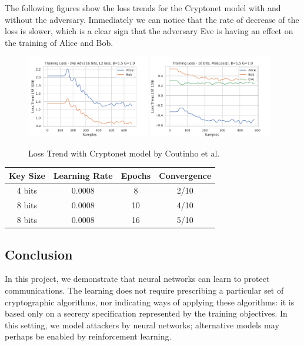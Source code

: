 \documentclass[a4paper]{article}
\begin{document}
  The following figures show the loss trends for the Cryptonet model with and without the adversary.
  Immediately we can notice that the rate of decrease of the loss is slower, which is a clear sign that
  the adversary Eve is having an effect on the training of Alice and Bob.

  \begin{figure}[H]
    \centering
    \includegraphics[width=0.48\textwidth]{../../models/cryptonet/graphs/loss_1E64x256v13.png}
    \includegraphics[width=0.48\textwidth]{../../models/cryptonet/graphs/loss_1E64x256v19.png}
    \caption{Loss Trend with Cryptonet model by Coutinho et al.}
    \label{fig:res_crnet}
  \end{figure}

  \begin{center}
    \begin{tabular}{ c c c c }
      \hline
      \textbf{Key Size} & \textbf{Learning Rate} & \textbf{Epochs} & \textbf{Convergence} \\ \hline
      4 bits            & 0.0008                 & 8               & 2/10                 \\
      8 bits            & 0.0008                 & 10              & 4/10                 \\
      8 bits            & 0.0008                 & 16              & 5/10                 \\
      \hline
    \end{tabular}
  \end{center}

    \pagebreak
    \subsection{Conclusion}
    In this project, we demonstrate that neural networks can learn to protect communications. The learning
    does not require prescribing a particular set of cryptographic algorithms, nor indicating ways
    of applying these algorithms: it is based only on a secrecy specification represented by the training
    objectives. In this setting, we model attackers by neural networks; alternative models may perhaps
    be enabled by reinforcement learning.
\end{document}
